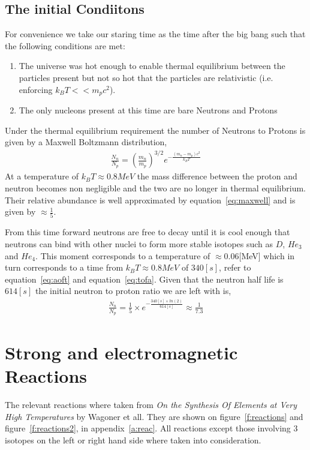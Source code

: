 \documentclass[twoside]{article}
\begin{document}
\subsection{The initial Condiitons}
For convenience we take our staring time as the time after the big bang such that the following conditions are met:
\begin{enumerate}
 \item The universe was hot enough to enable thermal equilibrium between the particles present but not so hot that the particles are relativistic (i.e. enforcing $k_{B}T<<m_{p}c^{2}$).
\item The only nucleons present at this time are bare Neutrons and Protons
\end{enumerate}
Under the thermal equilibrium requirement the number of Neutrons to Protons is given by a Maxwell Boltzmann distribution,
\begin{align}
\frac{N_{n}}{N_{p}}  = \left(\frac{m_{n}}{m_{p}}\right)^{3/2}e^{-\frac{(m_{n}-m_{p})c^{2}}{k_{B}T}}\label{eq:maxwell}
\end{align}
At a temperature of $k_{B}T\approx 0.8MeV$ the mass difference between the proton and neutron becomes non negligible and the two are no longer in thermal equilibrium. Their relative abundance is well approximated by equation~\ref{eq:maxwell} and is given by $\approx \frac{1}{5}$.\par

From this time forward neutrons are free to decay until it is cool enough that neutrons can bind with other nuclei to form more stable isotopes such as $D$, $He_{3}$ and $He_{4}$. This moment corresponds to a temperature of $\approx 0.06$[MeV] which in turn corresponds to a time from $k_{B}T \approx 0.8MeV$ of $340 [s]$, refer to  equation~\ref{eq:aoft} and equation~\ref{eq:tofa}. Given that the neutron half life is $614[s]$ the initial neutron to proton ratio we are left with is,
\begin{align}
\frac{N_{n}}{N_{p}} = \frac{1}{5}\times e^{-\frac{340[s]\times ln(2)}{614[s]}}\approx \frac{1}{7.3}
\end{align}


\section{Strong and electromagnetic Reactions} 
The relevant reactions where taken from \emph{On the Synthesis Of Elements at Very High Temperatures} by Wagoner et all. They are shown on figure~\ref{f:reactions} and figure~\ref{f:reactions2}, in appendix~\ref{a:reac}. All reactions except those involving 3 isotopes on the left or right hand side where taken into consideration.\par 
\end{document}
